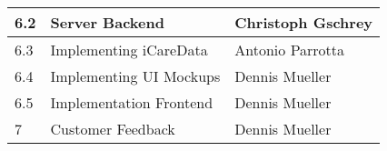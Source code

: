 \begin{table}[h!]
\begin{tabular}{|l|l|l|}
\hline
6.2     & Server Backend            & Christoph Gschrey                                  \\
\hline
6.3     & Implementing iCareData    & Antonio Parrotta                                   \\
\hline
6.4     & Implementing UI Mockups   & Dennis Mueller                                      \\
\hline
6.5     & Implementation Frontend   & Dennis Mueller                                      \\
\hline
7       & Customer Feedback         & Dennis Mueller    \\              
\hline               
\end{tabular}
\end{table}